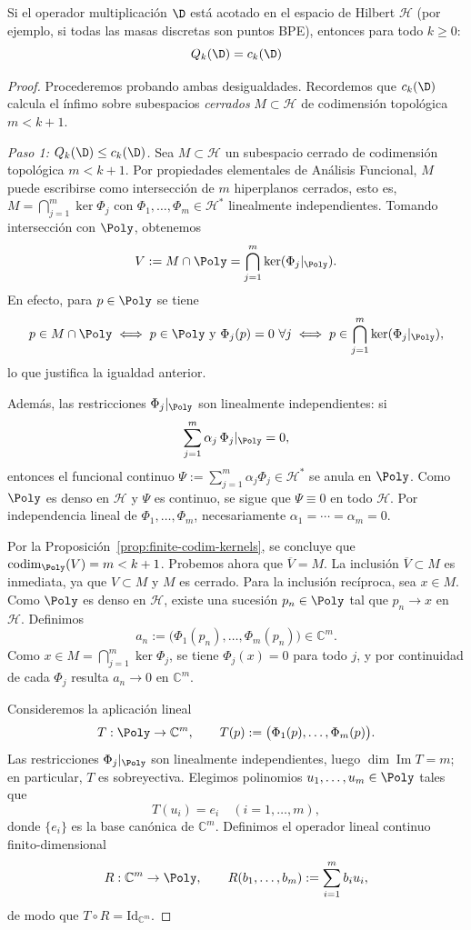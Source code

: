 \begin{thm}\label{thm:equivalencia_Qk_Gelfand}
	Si el operador multiplicación $\D$ está acotado en el espacio de Hilbert $\mathcal{H}$ (por ejemplo, si todas las masas discretas son puntos BPE), entonces para todo $k \ge 0$:
	$$ Q_k(\D) = c_k(\D) $$
\end{thm}

\begin{proof}
	Procederemos probando ambas desigualdades. Recordemos que $c_k(\D)$ calcula el ínfimo sobre subespacios \textit{cerrados} $M \subset \mathcal{H}$ de codimensión topológica $m < k+1$.

	\emph{Paso 1: $Q_k(\D) \le c_k(\D)$.}
	Sea $M \subset \mathcal{H}$ un subespacio cerrado de codimensión topológica $m < k+1$. Por propiedades elementales de Análisis Funcional, $M$ puede escribirse como intersección de $m$ hiperplanos cerrados, esto es, $M=\bigcap_{j=1}^m\ker\Phi_j$ con $\Phi_1,\dots,\Phi_m\in\mathcal{H}^*$ linealmente independientes. Tomando intersección con $\Poly$, obtenemos
	\[
		V:=M\cap\Poly=\bigcap_{j=1}^m\ker(\Phi_j|_{\Poly}).
	\]
	En efecto, para $p\in\Poly$ se tiene
	\[
		p\in M\cap\Poly
		\iff p\in\Poly\ \text{y}\ \Phi_j(p)=0\ \forall j
		\iff p\in\bigcap_{j=1}^m\ker(\Phi_j|_{\Poly}),
	\]
	lo que justifica la igualdad anterior.

	Además, las restricciones $\Phi_j|_{\Poly}$ son linealmente independientes: si
	\[
		\sum_{j=1}^m \alpha_j\,\Phi_j|_{\Poly}=0,
	\]
	entonces el funcional continuo $\Psi:=\sum_{j=1}^m \alpha_j\Phi_j\in\mathcal{H}^*$ se anula en $\Poly$. Como $\Poly$ es denso en $\mathcal{H}$ y $\Psi$ es continuo, se sigue que $\Psi\equiv 0$ en todo $\mathcal{H}$. Por independencia lineal de $\Phi_1,\dots,\Phi_m$, necesariamente $\alpha_1=\cdots=\alpha_m=0$.

	Por la Proposición~\ref{prop:finite-codim-kernels}, se concluye que $\operatorname{codim}_{\Poly}(V)=m<k+1$.
	Probemos ahora que $\overline V=M$. La inclusión $\overline V\subset M$ es inmediata, ya que $V\subset M$ y $M$ es cerrado. Para la inclusión recíproca, sea $x\in M$. Como $\Poly$ es denso en $\mathcal H$, existe una sucesión $p_n\in \Poly$ tal que $p_n\to x$ en $\mathcal H$. Definimos
	\[
		a_n:=\bigl(\Phi_1(p_n),\dots,\Phi_m(p_n)\bigr)\in\mathbb C^m.
	\]
	Como $x\in M=\bigcap_{j=1}^m\ker\Phi_j$, se tiene $\Phi_j(x)=0$ para todo $j$, y por continuidad de cada $\Phi_j$ resulta $a_n\to 0$ en $\mathbb C^m$.

	Consideremos la aplicación lineal
	\[
		T:\Poly\to\mathbb C^m,\qquad T(p):=\bigl(\Phi_1(p),\dots,\Phi_m(p)\bigr).
	\]
	Las restricciones $\Phi_j|_{\Poly}$ son linealmente independientes, luego $\dim\operatorname{Im}T=m$; en particular, $T$ es sobreyectiva. Elegimos polinomios $u_1,\dots,u_m\in\Poly$ tales que
	\[
		T(u_i)=e_i\quad (i=1,\dots,m),
	\]
	donde $\{e_i\}$ es la base canónica de $\mathbb C^m$. Definimos el operador lineal continuo finito-dimensional
	\[
		R:\mathbb C^m\to\Poly,\qquad R(b_1,\dots,b_m):=\sum_{i=1}^m b_i u_i,
	\]
	de modo que $T\circ R=\mathrm{Id}_{\mathbb C^m}$.


\end{proof}
